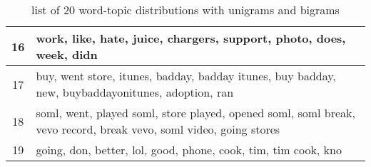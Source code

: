 \begin{table}
\begin{tabular}{c p{16cm}}
    16    & work, like, hate, juice, chargers, support, photo, does, week, didn \\ \midrule
    17    & buy, went store, itunes, badday, badday itunes, buy badday, new, buybaddayonitunes, adoption, ran \\ \midrule
    18    & soml, went, played soml, store played, opened soml, soml break, vevo record, break vevo, soml video, going stores \\ \midrule
    19    & going, don, better, lol, good, phone, cook, tim, tim cook, kno \\ \bottomrule
  \end{tabular}
  \caption{list of 20 word-topic distributions with unigrams and bigrams}
  \label{tab:unigrams_bigrams_lda}
\end{table}

